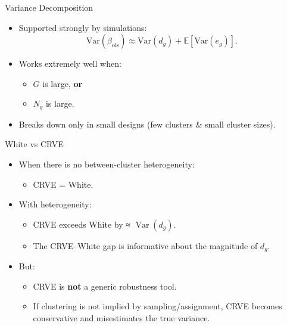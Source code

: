 \documentclass[
  ignorenonframetext,
]{beamer}
\providecommand{\tightlist}{%
  \setlength{\itemsep}{0pt}\setlength{\parskip}{0pt}}
\begin{document}
\begin{frame}{Variance Decomposition}
\label{variance-decomposition}
\begin{itemize}
\tightlist
\item
  Supported strongly by simulations: \[
  \mathrm{Var}(\hat{\beta}_{\text{ols}})
  \approx
  \mathrm{Var}(d_g) + \mathbb{E}[\mathrm{Var}(e_g)].
  \]
\item
  Works extremely well when:

  \begin{itemize}
  \tightlist
  \item
    \(G\) is large, \textbf{or}
  \item
    \(N_g\) is large.
  \end{itemize}
\item
  Breaks down only in small designs (few clusters \& small cluster
  sizes).
\end{itemize}
\end{frame}

\begin{frame}{White vs CRVE}
\label{white-vs-crve}
\begin{itemize}
\tightlist
\item
  When there is no between-cluster heterogeneity:

  \begin{itemize}
  \tightlist
  \item
    CRVE = White.
  \end{itemize}
\item
  With heterogeneity:

  \begin{itemize}
  \tightlist
  \item
    CRVE exceeds White by ≈ \(\operatorname{Var}(d_g)\).
  \item
    The CRVE--White gap is informative about the magnitude of \(d_g\).
  \end{itemize}
\item
  But:

  \begin{itemize}
  \tightlist
  \item
    CRVE is \textbf{not} a generic robustness tool.
  \item
    If clustering is not implied by sampling/assignment, CRVE becomes
    conservative and misestimates the true variance.
  \end{itemize}
\end{itemize}
\end{frame}
\end{document}

